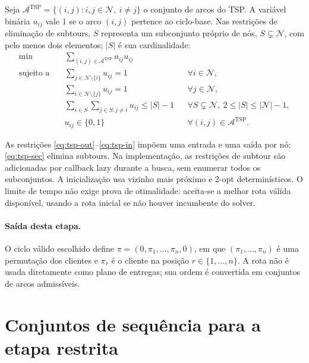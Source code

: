 \documentclass[11pt,a4paper]{article}
\newcommand{\N}{\mathcal{N}}
\newcommand{\A}{\mathcal{A}}
\begin{document}
Seja $\A^{\mathrm{TSP}}=\{(i,j):i,j\in\N,\ i\ne j\}$ o conjunto de arcos do TSP. A variável binária $u_{ij}$ vale $1$ se o arco $(i,j)$ pertence ao ciclo-base. Nas restrições de eliminação de subtours, $S$ representa um subconjunto próprio de nós, $S\subsetneq\N$, com pelo menos dois elementos; $|S|$ é sua cardinalidade:
\begin{align}
 \min\quad & \sum_{(i,j)\in\A^{\mathrm{TSP}}} a_{ij}u_{ij} \label{eq:tsp-obj}\\
 \text{sujeito a}\quad
 & \sum_{j\in\N\setminus\{i\}} u_{ij}=1 && \forall i\in\N, \label{eq:tsp-out}\\
 & \sum_{i\in\N\setminus\{j\}} u_{ij}=1 && \forall j\in\N, \label{eq:tsp-in}\\
 & \sum_{i\in S}\sum_{j\in S:j\ne i}u_{ij}\le |S|-1
     && \forall S\subsetneq\N,\ 2\le |S|\le |\N|-1, \label{eq:tsp-sec}\\
 & u_{ij}\in\{0,1\} && \forall (i,j)\in\A^{\mathrm{TSP}}. \label{eq:tsp-dom}
\end{align}

As restrições \eqref{eq:tsp-out}--\eqref{eq:tsp-in} impõem uma entrada e uma saída por nó; \eqref{eq:tsp-sec} elimina subtours. Na implementação, as restrições de subtour são adicionadas por callback lazy durante a busca, sem enumerar todos os subconjuntos. A inicialização usa vizinho mais próximo e 2-opt determinísticos. O limite de tempo não exige prova de otimalidade: aceita-se a melhor rota válida disponível, usando a rota inicial se não houver incumbente do solver.

\paragraph{Saída desta etapa.} O ciclo válido escolhido define $\pi=(0,\pi_1,\ldots,\pi_n,0)$, em que $(\pi_1,\ldots,\pi_n)$ é uma permutação dos clientes e $\pi_r$ é o cliente na posição $r\in\{1,\ldots,n\}$. A rota não é usada diretamente como plano de entregas; sua ordem é convertida em conjuntos de arcos admissíveis.

\section{Conjuntos de sequência para a etapa restrita}
\end{document}
